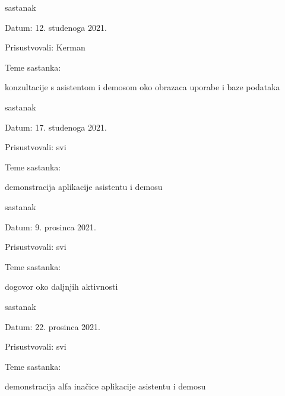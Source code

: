 \begin{packed_enum}
			\item  sastanak
			\item[] \begin{packed_item}
				\item Datum: 12. studenoga 2021.
				\item Prisustvovali: Kerman
				\item Teme sastanka:
				\begin{packed_item}
					\item  konzultacije s asistentom i demosom oko obrazaca uporabe i baze podataka
				\end{packed_item}
			\end{packed_item}
			
			\item  sastanak
			\item[] \begin{packed_item}
				\item Datum: 17. studenoga 2021.
				\item Prisustvovali: svi
				\item Teme sastanka:
				\begin{packed_item}
					\item demonstracija aplikacije asistentu i demosu
				\end{packed_item}
			\end{packed_item}
			
			\item  sastanak
			\item[] \begin{packed_item}
				\item Datum: 9. prosinca 2021.
				\item Prisustvovali: svi
				\item Teme sastanka:
				\begin{packed_item}
					\item dogovor oko daljnjih aktivnosti
				\end{packed_item}
			\end{packed_item}
			
			\item  sastanak
			\item[] \begin{packed_item}
				\item Datum: 22. prosinca 2021.
				\item Prisustvovali: svi
				\item Teme sastanka:
				\begin{packed_item}
					\item demonstracija alfa inačice aplikacije asistentu i demosu
				\end{packed_item}
			\end{packed_item}
			
			
		\end{packed_enum}
		
